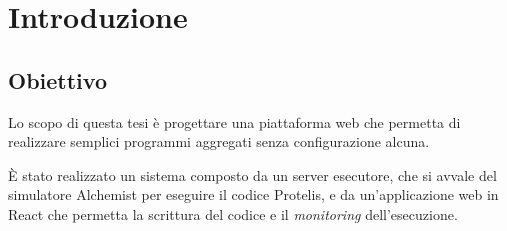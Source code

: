 \section{Introduzione}
  \subsection{Obiettivo}
  \begin{frame}{\insertsection}{\insertsubsection}

    Lo scopo di questa tesi è progettare una piattaforma web che permetta di realizzare semplici programmi aggregati senza configurazione alcuna.

    \medskip

    È stato realizzato un sistema composto da un server esecutore, che si avvale del simulatore Alchemist per eseguire il codice Protelis,
    e da un'applicazione web in React che permetta la scrittura del codice e il \emph{monitoring} dell'esecuzione.

  \end{frame}
